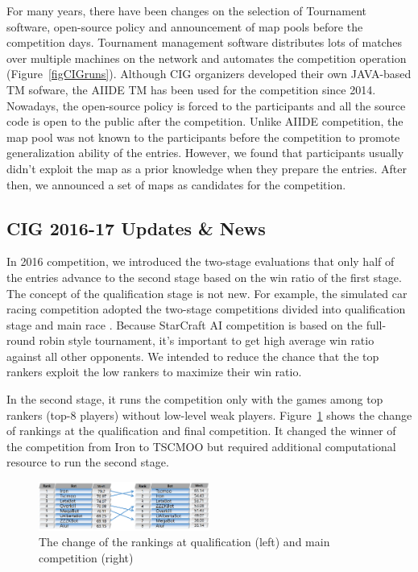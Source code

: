 For many years, there have been changes on the selection of Tournament software, open-source policy and announcement of map pools before the competition days. Tournament management software distributes lots of matches over multiple machines on the network and automates the competition operation (Figure~\ref{figCIGruns}). Although CIG organizers developed their own JAVA-based TM sofware, the AIIDE TM has been used for the competition since 2014. Nowadays, the open-source policy is forced to the participants and all the source code is open to the public after the competition. Unlike AIIDE competition, the map pool was not known to the participants before the competition to promote generalization ability of the entries. However, we found that participants usually didn't exploit the map as a prior knowledge when they prepare the entries. After then, we announced a set of maps as candidates for the competition. 

\subsection*{CIG 2016-17 Updates \& News}\label{subsecCIGnews}

In 2016 competition, we introduced the two-stage evaluations that only half of the entries advance to the second stage based on the win ratio of the first stage. The concept of the qualification stage is not new. For example, the simulated car racing competition adopted the two-stage competitions divided into qualification stage and main race \cite{loiacono20102009}. Because StarCraft AI competition is based on the full-round robin style tournament, it's important to get high average win ratio against all other opponents. We intended to  reduce the chance that the top rankers exploit the low rankers to maximize their win ratio. 

In the second stage, it runs the competition only with the games among top rankers (top-8 players) without low-level weak players. Figure~\ref{figCIGtwostages} shows the change of rankings at the qualification and final competition. It changed the winner of the competition from Iron to TSCMOO but required additional computational resource to run the second stage. 

\begin{figure}[h]
  \centering
  \includegraphics[width=0.5\textwidth]{fig/cig-two-stage-result.png}
  \caption{The change of the rankings at qualification (left) and main competition (right)}
  \label{figCIGtwostages}
\end{figure}

